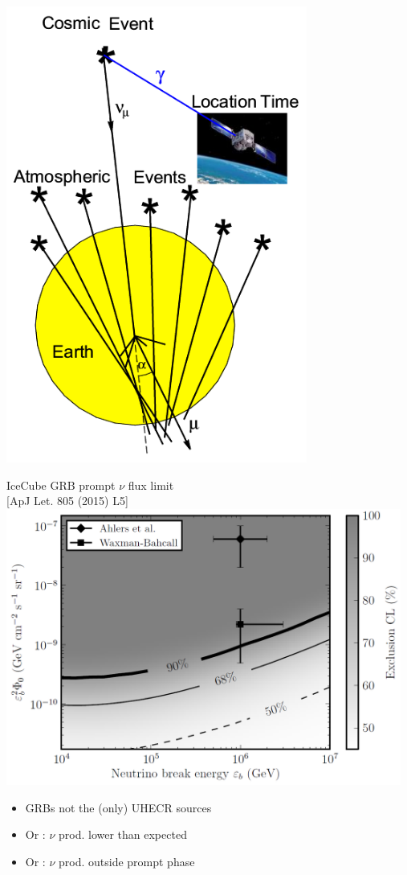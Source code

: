 \Tr
\twocolumn
\begin{center}
\includegraphics[keepaspectratio,height=15cm]{atm-bkg}
\end{center}

\newpage

\begin{center}
{\red IceCube GRB prompt $\nu$ flux limit}\\
{\large [ApJ Let. 805 (2015) L5]}\\
\includegraphics[keepaspectratio,width=13cm]{ic-grb-limit-prompt}
\end{center}
\begin{itemize}
\item[] GRBs not the (only) UHECR sources
\item[] {\blue Or :} $\nu$ prod. lower than expected
\item[] {\blue Or :} $\nu$ prod. outside prompt phase
\end{itemize}

